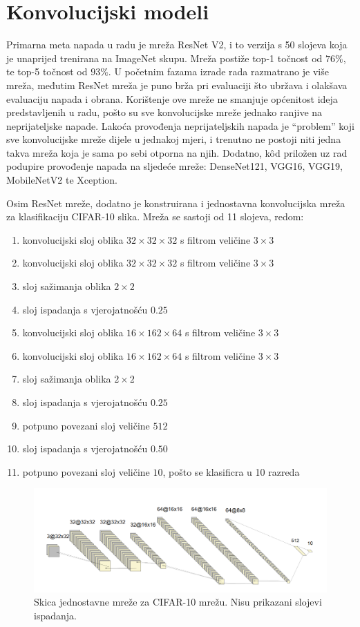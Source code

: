 \documentclass[utf8, diplomski]{fer}
\begin{document}
\section{Konvolucijski modeli}\label{custom_model}
Primarna meta napada u radu je mreža ResNet V2\citep{resnetv2}, i to verzija s 50 slojeva koja je unaprijed trenirana na ImageNet skupu. Mreža postiže top-1 točnost od $76\%$, te top-5 točnost od $93\%$.  U početnim fazama izrade rada razmatrano je više mreža, međutim ResNet mreža je puno brža pri evaluaciji što ubržava i olakšava evaluaciju napada i obrana. Korištenje ove mreže ne smanjuje općenitost ideja predstavljenih u radu, pošto su sve konvolucijske mreže jednako ranjive na neprijateljske napade. Lakoća provođenja neprijateljskih napada je ``problem'' koji sve konvolucijske mreže dijele u jednakoj mjeri, i trenutno ne postoji niti jedna takva mreža koja je sama po sebi otporna na njih. Dodatno, kôd priložen uz rad podupire provođenje napada na sljedeće mreže: DenseNet121, VGG16, VGG19, MobileNetV2 te Xception.
\par
Osim ResNet mreže, dodatno je konstruirana i jednostavna konvolucijska mreža za klasifikaciju CIFAR-10 slika. Mreža se sastoji od 11 slojeva, redom:
\begin{enumerate}[noitemsep, label=\textbullet]
  \item konvolucijski sloj oblika $32\times32\times32$ s filtrom veličine $3\times3$
  \item konvolucijski sloj oblika $32\times32\times32$ s filtrom veličine $3\times3$
  \item sloj sažimanja oblika $2\times2$
  \item sloj ispadanja s vjerojatnošću $0.25$
  \item konvolucijski sloj oblika $16\times162\times64$ s filtrom veličine $3\times3$
  \item konvolucijski sloj oblika $16\times162\times64$ s filtrom veličine $3\times3$
  \item sloj sažimanja oblika $2\times2$
  \item sloj ispadanja s vjerojatnošću $0.25$
  \item potpuno povezani sloj veličine $512$
  \item sloj ispadanja s vjerojatnošću $0.50$
  \item potpuno povezani sloj veličine $10$, pošto se klasificra u 10 razreda
\end{enumerate}

\begin{figure}[H]
\centering
\includegraphics[width=1\textwidth,keepaspectratio]{img/other/toy_cifar10.png}
\caption{Skica jednostavne mreže za CIFAR-10 mrežu. Nisu prikazani slojevi ispadanja.}
\label{fig:toy_cifar10}
\end{figure}
\end{document}

